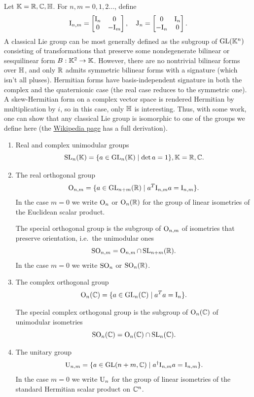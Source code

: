 \begin{example}
    Let $\mathbb{K}=\mathbb{R},\mathbb{C},\mathbb{H}$. For $n,m=0,1,2\ldots$, define
    \[\mathrm{I}_{n,m}=
    \begin{bmatrix}
        \mathrm{I}_n&0\\0&-\mathrm{I}_m
    \end{bmatrix},\quad \mathrm{J}_n=
    \begin{bmatrix}
        0&\mathrm{I}_n\\-\mathrm{I}_n&0
    \end{bmatrix}.
    \]
    A classical Lie group can be most generally defined as the subgroup of $\operatorname{GL}(\mathbb{K}^n)$ consisting of transformations that preserve some nondegenerate bilinear or sesquilinear form $B:\mathbb{K}^2\to \mathbb{K}$. However, there are no nontrivial bilinear forms over $\mathbb{H}$, and only $\mathbb{R}$ admits symmetric bilinear forms with a signature (which isn't all pluses). Hermitian forms have basis-independent signature in both the complex and the quaternionic case (the real case reduces to the symmetric one). A skew-Hermitian form on a complex vector space is rendered Hermitian by multiplication by $i$, so in this case, only $\mathbb{H}$ is interesting. Thus, with some work, one can show that any classical Lie group is isomorphic to one of the groups we define here (the \href{https://en.wikipedia.org/wiki/Classical_group}{Wikipedia page} has a full derivation).
    \begin{enumerate}
        \item Real and complex unimodular groups
        \[\operatorname{SL}_n(\mathbb{K})=\{a\in\operatorname{GL}_n(\mathbb{K})\mid \det a=1\}, \mathbb{K}=\mathbb{R},\mathbb{C}.\]
        \item The real orthogonal group
        \[\operatorname{O}_{n,m}=\{a\in\operatorname{GL}_{n+m}(\mathbb{R})\mid a^T \mathrm{I}_{n,m}a=\mathrm{I}_{n,m}\}.\]
        In the case $m=0$ we write $\operatorname{O}_n$ or $\operatorname{O}_n(\mathbb{R})$ for the group of linear isometries of the Euclidean scalar product.

        The special orthogonal group is the subgroup of $\operatorname{O}_{n,m}$ of isometries that preserve orientation, i.e.~the unimodular ones
        \[\operatorname{SO}_{n,m}=\operatorname{O}_{n,m}\cap \operatorname{SL}_{n+m}(\mathbb{R}).\]
        In the case $m=0$ we write $\operatorname{SO}_n$ or $\operatorname{SO}_n(\mathbb{R})$.
        \item The complex orthogonal group
        \[\operatorname{O}_{n}(\mathbb{C})=\{a\in\operatorname{GL}_{n}(\mathbb{C})\mid a^T a=\mathrm{I}_{n}\}.\]

        The special complex orthogonal group is the subgroup of $\operatorname{O}_{n}(\mathbb{C})$ of unimodular isometries
        \[\operatorname{SO}_{n}(\mathbb{C})=\operatorname{O}_{n}(\mathbb{C})\cap \operatorname{SL}_{n}(\mathbb{C}).\]
        \item The unitary group
        \[\operatorname{U}_{n,m}=\{a\in \operatorname{GL}(n+m,\mathbb{C})\mid a^\dagger \mathrm{I}_{n,m}a=\mathrm{I}_{n,m}\}.\]
        In the case $m=0$ we write $\operatorname{U}_n$ for the group of linear isometries of the standard Hermitian scalar product on $\mathbb{C}^n$.


\end{enumerate}
\end{example}
